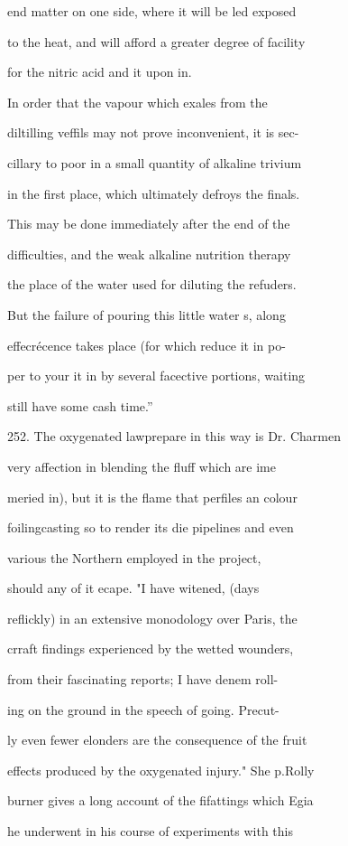 \documentclass{article}
\begin{document}
end matter on one side, where it will be led exposed

to the heat, and will afford a greater degree of facility

for the nitric acid and it upon in.

In order that the vapour which exales from the

diltilling veffils may not prove inconvenient, it is sec-

cillary to poor in a small quantity of alkaline trivium

in the first place, which ultimately defroys the finals.

This may be done immediately after the end of the

difficulties, and the weak alkaline nutrition therapy

the place of the water used for diluting the refuders.

But the failure of pouring this little water s, along

effecrécence takes place (for which reduce it in po-

per to your it in by several facective portions, waiting

still have some cash time.”

252. The oxygenated lawprepare in this way is Dr. Charmen

very affection in blending the fluff which are ime

meried in), but it is the flame that perfiles an colour

foilingcasting so to render its die pipelines and even

various the Northern employed in the project,

should any of it ecape. "I have witened, (days

reflickly) in an extensive monodology over Paris, the

crraft findings experienced by the wetted wounders,

from their fascinating reports; I have denem roll-

ing on the ground in the speech of going. Precut-

ly even fewer elonders are the consequence of the fruit

effects produced by the oxygenated injury." She p.Rolly

burner gives a long account of the fifattings which Egia

he underwent in his course of experiments with this
\end{document}
